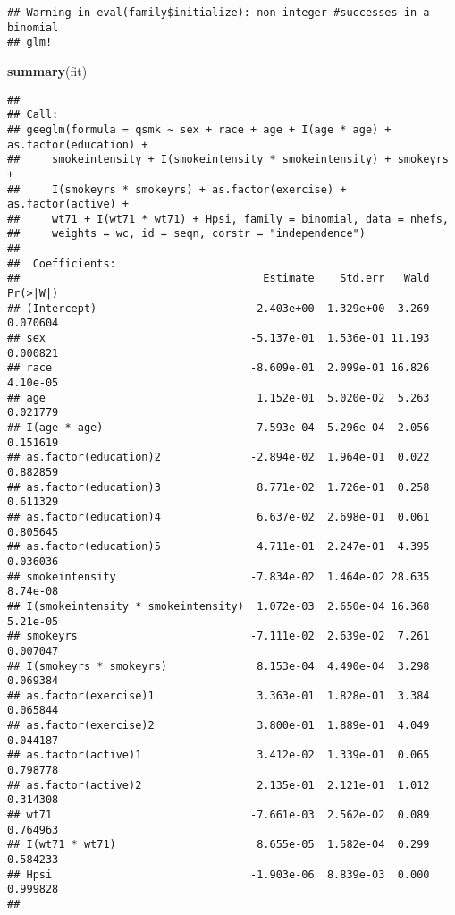 \documentclass[10pt,]{book}
\newenvironment{Shaded}{\begin{snugshade}}{\end{snugshade}}
\newcommand{\KeywordTok}[1]{\textcolor[rgb]{0.13,0.29,0.53}{\textbf{#1}}}
\newcommand{\NormalTok}[1]{#1}
\begin{document}
\begin{verbatim}
## Warning in eval(family$initialize): non-integer #successes in a binomial
## glm!
\end{verbatim}

\begin{Shaded}
\begin{Highlighting}[]
\KeywordTok{summary}\NormalTok{(fit)}
\end{Highlighting}
\end{Shaded}

\begin{verbatim}
## 
## Call:
## geeglm(formula = qsmk ~ sex + race + age + I(age * age) + as.factor(education) + 
##     smokeintensity + I(smokeintensity * smokeintensity) + smokeyrs + 
##     I(smokeyrs * smokeyrs) + as.factor(exercise) + as.factor(active) + 
##     wt71 + I(wt71 * wt71) + Hpsi, family = binomial, data = nhefs, 
##     weights = wc, id = seqn, corstr = "independence")
## 
##  Coefficients:
##                                      Estimate    Std.err   Wald Pr(>|W|)
## (Intercept)                        -2.403e+00  1.329e+00  3.269 0.070604
## sex                                -5.137e-01  1.536e-01 11.193 0.000821
## race                               -8.609e-01  2.099e-01 16.826 4.10e-05
## age                                 1.152e-01  5.020e-02  5.263 0.021779
## I(age * age)                       -7.593e-04  5.296e-04  2.056 0.151619
## as.factor(education)2              -2.894e-02  1.964e-01  0.022 0.882859
## as.factor(education)3               8.771e-02  1.726e-01  0.258 0.611329
## as.factor(education)4               6.637e-02  2.698e-01  0.061 0.805645
## as.factor(education)5               4.711e-01  2.247e-01  4.395 0.036036
## smokeintensity                     -7.834e-02  1.464e-02 28.635 8.74e-08
## I(smokeintensity * smokeintensity)  1.072e-03  2.650e-04 16.368 5.21e-05
## smokeyrs                           -7.111e-02  2.639e-02  7.261 0.007047
## I(smokeyrs * smokeyrs)              8.153e-04  4.490e-04  3.298 0.069384
## as.factor(exercise)1                3.363e-01  1.828e-01  3.384 0.065844
## as.factor(exercise)2                3.800e-01  1.889e-01  4.049 0.044187
## as.factor(active)1                  3.412e-02  1.339e-01  0.065 0.798778
## as.factor(active)2                  2.135e-01  2.121e-01  1.012 0.314308
## wt71                               -7.661e-03  2.562e-02  0.089 0.764963
## I(wt71 * wt71)                      8.655e-05  1.582e-04  0.299 0.584233
## Hpsi                               -1.903e-06  8.839e-03  0.000 0.999828
##                                       

\end{verbatim}
\end{document}
